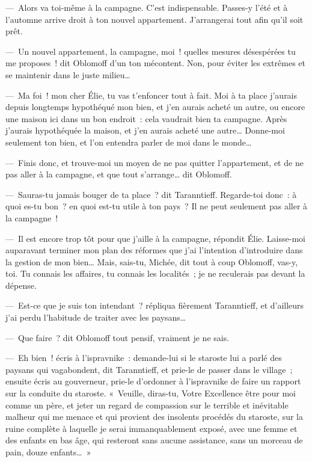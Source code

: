 \documentclass[french,twoside]{book} %
\begin{document}
— Alors va toi-même à la campagne. C’est indispensable. Passes-y l’été et à l’automne arrive droit à ton nouvel appartement. J’arrangerai tout afin qu’il soit prêt.\par
— Un nouvel appartement, la campagne, moi ! quelles mesures désespérées tu me proposes ! dit Oblomoff d’un ton mécontent. Non, pour éviter les extrêmes et se maintenir dans le juste milieu…\par
— Ma foi ! mon cher Élie, tu vas t’enfoncer tout à fait. Moi à ta place j’aurais depuis longtemps hypothéqué mon bien, et j’en aurais acheté un autre, ou encore une maison ici dans un bon endroit : cela vaudrait bien ta campagne. Après j’aurais hypothéquée la maison, et j’en aurais acheté une autre… Donne-moi seulement ton bien, et l’on entendra parler de moi dans le monde…\par
— Finis donc, et trouve-moi un moyen de ne pas quitter l’appartement, et de ne pas aller à la campagne, et que tout s’arrange… dit Oblomoff.\par
— Sauras-tu jamais bouger de ta place ? dit Taranntieff. Regarde-toi donc : à quoi es-tu bon ? en quoi est-tu utile à ton pays ? Il ne peut seulement pas aller à la campagne !\par
— Il est encore trop tôt pour que j’aille à la campagne, répondit Élie. Laisse-moi auparavant terminer mon plan des réformes que j’ai l’intention d’introduire dans la gestion de mon bien… Mais, sais-tu, Michée, dit tout à coup Oblomoff, vas-y, toi. Tu connais les affaires, tu connais les localités ; je ne reculerais pas devant la dépense.\par
— Est-ce que je suis ton intendant ? répliqua fièrement Taranntieff, et d’ailleurs j’ai perdu l’habitude de traiter avec les paysans…\par
— Que faire ? dit Oblomoff tout pensif, vraiment je ne sais.\par
— Eh bien ! écris à l’ispravnike : demande-lui si le staroste lui a parlé des paysans qui vagabondent, dit Taranntieff, et prie-le de passer dans le village ; ensuite écris au gouverneur, prie-le d’ordonner à l’ispravnike de faire un rapport sur la conduite du staroste. « Veuille, diras-tu, Votre Excellence être pour moi comme un père, et jeter un regard de compassion sur le terrible et inévitable malheur qui me menace et qui provient des insolents procédés du staroste, sur la ruine complète à laquelle je serai immanquablement exposé, avec une femme et des enfants en bas âge, qui resteront sans aucune assistance, sans un morceau de pain, douze enfants… »\par
\end{document}
